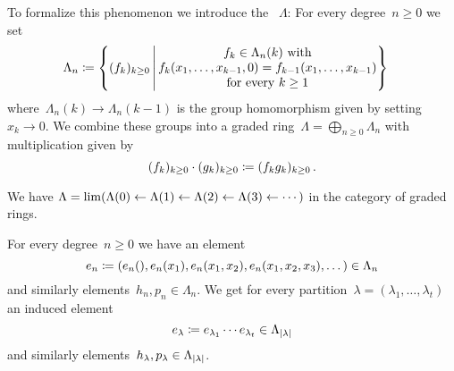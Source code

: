 \documentclass[a4paper,10pt]{scrartcl}
\begin{document}

To formalize this phenomenon we introduce the ~$\Lambda$:
For every degree~$n \geq 0$ we set
\begin{align*}
  \Lambda_n
  &\defined
  \left\{
    (f_k)_{k \geq 0}
  \suchthat*
    \begin{tabular}{@{}c@{}}
      $f_k \in \Lambda_n(k)$ with \\
      $f_k(x_1, \dotsc, x_{k-1}, 0) = f_{k-1}(x_1, \dotsc, x_{k-1})$ \\
      for every~$k \geq 1$
    \end{tabular}
  \right\}
\end{align*}
where~$\Lambda_n(k) \to \Lambda_n(k-1)$ is the group homomorphism given by setting  ~$x_k \to 0$.
We combine these groups into a graded ring~$\Lambda = \bigoplus_{n \geq 0} \Lambda_n$ with multiplication given by
\[
  (f_k)_{k \geq 0} \cdot (g_k)_{k \geq 0}
  \coloneqq
  (f_k g_k)_{k \geq 0} \,.
\]

\begin{remark}
  We have
  $
    \Lambda
    =
    \lim( \Lambda(0) \leftarrow \Lambda(1) \leftarrow \Lambda(2) \leftarrow \Lambda(3) \leftarrow \dotsb)
  $
  in the category of graded rings.
\end{remark}

\begin{example}
  For every degree~$n \geq 0$ we have an element
  \[
    e_n
    \coloneqq
    (e_n(), e_n(x_1), e_n(x_1, x_2), e_n(x_1, x_2, x_3), \dotsc)
    \in
    \Lambda_n
  \]
  and similarly elements~$h_n, p_n \in \Lambda_n$.
  We get for every partition~$\lambda = (\lambda_1, \dotsc, \lambda_t)$ an induced element
  \[
    e_{\lambda}
    \coloneqq
    e_{\lambda_1} \dotsm e_{\lambda_t}
    \in
    \Lambda_{\lvert\lambda\rvert}
  \]
  and similarly elements~$h_{\lambda}, p_{\lambda} \in \Lambda_{\lvert\lambda\rvert}$.
\end{example}
\end{document}
